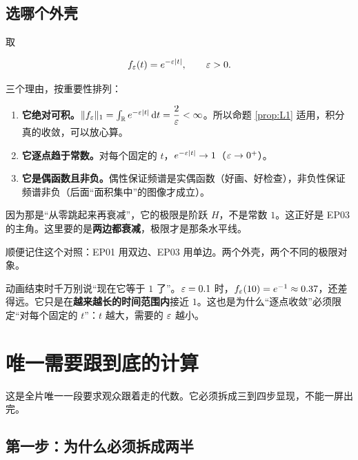 \subsection{选哪个外壳}

取

\begin{equation}
f_\varepsilon(t)=e^{-\varepsilon|t|},\qquad \varepsilon>0 .\label{eq:feps}
\end{equation}

三个理由，按重要性排列：

\begin{enumerate}[leftmargin=2em,itemsep=0.4em]
\item \textbf{它绝对可积。}$\|f_\varepsilon\|_1=\int_{\mathbb{R}}e^{-\varepsilon|t|}\mathop{}\!\mathrm{d} t=\dfrac{2}{\varepsilon}<\infty$。所以命题 \ref{prop:L1} 适用，积分真的收敛，可以放心算。
\item \textbf{它逐点趋于常数。}对每个固定的 $t$，$e^{-\varepsilon|t|}\to1$（$\varepsilon\to0^+$）。
\item \textbf{它是偶函数且非负。}偶性保证频谱是实偶函数（好画、好检查），非负性保证频谱非负（后面“面积集中”的图像才成立）。
\end{enumerate}

\begin{notebox}[为什么不用单边衰减 $e^{-\ep t}H(t)$]
因为那是“从零跳起来再衰减”，它的极限是阶跃 $H$，不是常数 $1$。这正好是 EP03 的主角。这里要的是\textbf{两边都衰减}，极限才是那条水平线。

顺便记住这个对照：EP01 用双边、EP03 用单边。两个外壳，两个不同的极限对象。
\end{notebox}

\begin{warnbox}
动画结束时千万别说“现在它等于 $1$ 了”。$\varepsilon=0.1$ 时，$f_\varepsilon(10)=e^{-1}\approx0.37$，还差得远。它只是在\textbf{越来越长的时间范围内}接近 $1$。这也是为什么“逐点收敛”必须限定“对每个固定的 $t$”：$t$ 越大，需要的 $\varepsilon$ 越小。
\end{warnbox}

\section{唯一需要跟到底的计算}

这是全片唯一一段要求观众跟着走的代数。它必须拆成三到四步显现，不能一屏出完。

\subsection{第一步：为什么必须拆成两半}


